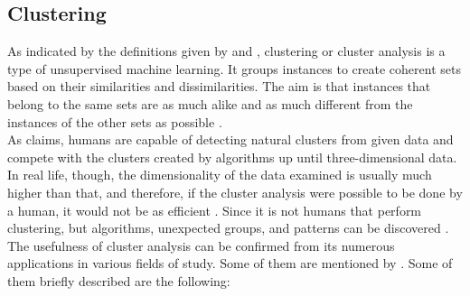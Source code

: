 \subsection{Clustering}
As indicated by the definitions given by \textcite{dunham} and \textcite{tanSteinKum}, clustering or cluster analysis is a type of unsupervised machine learning. It groups instances to create coherent sets based on their similarities and dissimilarities. The aim is that instances that belong to the same sets are as much alike and as much different from the instances of the other sets as possible \autocite{dunham, tanSteinKum}. \\
As \textcite{kantar} claims, humans are capable of detecting natural clusters from given data and compete with the clusters created by algorithms up until three-dimensional data. In real life, though, the dimensionality of the data examined is usually much higher than that, and therefore, if the cluster analysis were possible to be done by a human, it would not be as efficient \autocite[250]{kantar}. Since it is not humans that perform clustering, but algorithms, unexpected groups, and patterns can be discovered \autocite[444]{han}. \\
The usefulness of cluster analysis can be confirmed from its numerous applications in various fields of study. Some of them are mentioned by \textcite{clAnalysis}. Some of them briefly described are the following:
